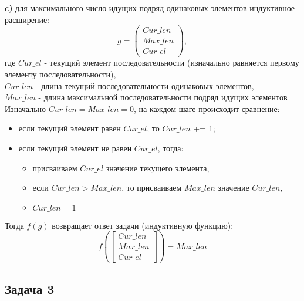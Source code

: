 \documentclass[a4paper,12pt]{article} %
\begin{document}
\textbf{c)} для максимального число идущих подряд одинаковых элементов индуктивное расширение:
$$g = \left(\begin{array}{c}{Cur\_len} \\ {Max\_len} \\ {Cur\_el}\end{array}\right),$$
где $ Cur\_el $ - текущий элемент последовательности (изначально равняется первому элементу последовательности),\\
$Cur\_len$ - длина текущий последовательности одинаковых элементов,\\
$ Max\_len $ - длина максимальной последовательности подряд идущих элементов\\
Изначально $Cur\_len = Max\_len = 0$, на каждом шаге происходит сравнение:
\begin{itemize}
\item если текущий элемент равен $Cur\_el$, то $Cur\_len  $ += 1;
\item если текущий элемент не равен $Cur\_el$, тогда:\\
\begin{itemize}
\item присваиваем $Cur\_el$ значение текущего элемента,
\item если $Cur\_len > Max\_len$, то присваиваем $Max\_len$ значение $Cur\_len$,
\item $Cur\_len = 1$
\end{itemize}
\end{itemize}
Тогда $f(g)$ возвращает ответ задачи (индуктивную функцию):
$$f\left(\left[\begin{array}{c}{Cur\_len} \\ {Max\_len} \\ {Cur\_el}\end{array}\right]\right)= Max\_len$$




\subsection*{Задача 3}
\end{document}
